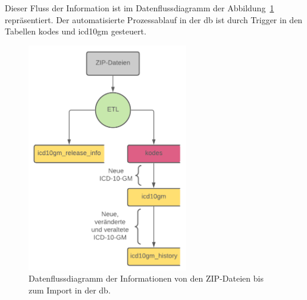 Dieser Fluss der Information ist im Datenflussdiagramm der Abbildung~\ref{fig:dbflow} repräsentiert. Der automatisierte Prozessablauf in der \ac{db} ist durch Trigger in den Tabellen \glqq\textsf{kodes}\grqq{} und \glqq\textsf{icd10gm}\grqq{} gesteuert.

\begin{figure}[ht]
	\centering
	\includegraphics[height=10cm]{figures/dbflow}
	\caption[Datenfluss des Prozesses]{Datenflussdiagramm der Informationen von den ZIP-Dateien bis zum Import in der \ac{db}.}
	\label{fig:dbflow}
\end{figure} 